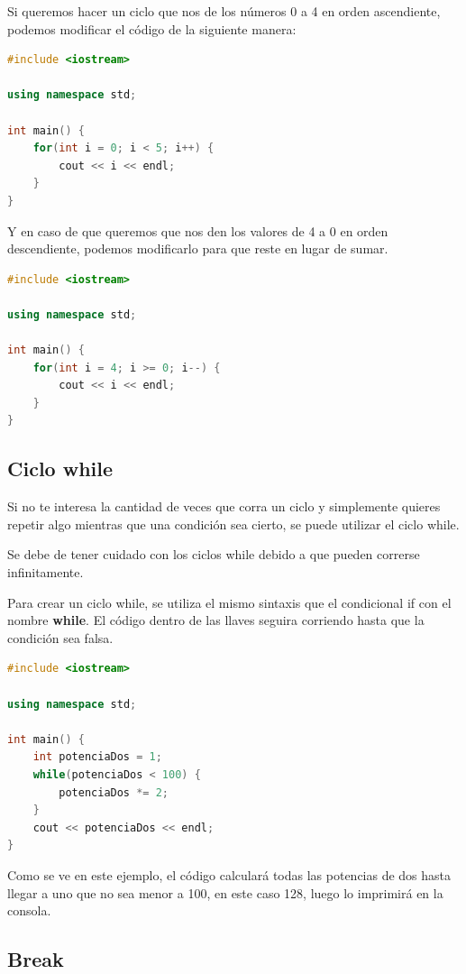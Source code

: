 \documentclass{article}
\begin{document}
Si queremos hacer un ciclo que nos de los números 0 a 4 en orden ascendiente, podemos modificar el código de la siguiente manera:

\begin{lstlisting}[language=C++, title=Ciclo for]
#include <iostream>

using namespace std;

int main() {
	for(int i = 0; i < 5; i++) {
		cout << i << endl;
	}
}
\end{lstlisting}

Y en caso de que queremos que nos den los valores de 4 a 0 en orden descendiente, podemos modificarlo para que reste en lugar de sumar.

\begin{lstlisting}[language=C++, title=Ciclo for]
#include <iostream>

using namespace std;

int main() {
	for(int i = 4; i >= 0; i--) {
		cout << i << endl;
	}
}
\end{lstlisting}

\subsection{Ciclo while}

Si no te interesa la cantidad de veces que corra un ciclo y simplemente quieres repetir algo mientras que una condición sea cierto, se puede utilizar el ciclo while.

Se debe de tener cuidado con los ciclos while debido a que pueden correrse infinitamente.

Para crear un ciclo while, se utiliza el mismo sintaxis que el condicional if con el nombre \textbf{while}. El código dentro de las llaves seguira corriendo hasta que la condición sea falsa.

\begin{lstlisting}[language=C++, title=Ciclo while]
#include <iostream>

using namespace std;

int main() {
	int potenciaDos = 1;
	while(potenciaDos < 100) {
		potenciaDos *= 2;
	}
	cout << potenciaDos << endl;
}
\end{lstlisting}

Como se ve en este ejemplo, el código calculará todas las potencias de dos hasta llegar a uno que no sea menor a 100, en este caso 128, luego lo imprimirá en la consola.

\subsection{Break}
\end{document}
